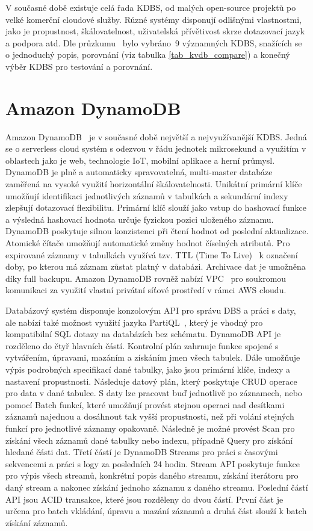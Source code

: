 \documentclass[czech,master,dept460,male,csharp,cpdeclaration]{diploma}
\begin{document}
	V současné době existuje celá řada KDBS, od malých open-source projektů po velké komerční cloudové služby. Různé systémy disponují odlišnými vlastnostmi, jako je propustnost, škálovatelnost, uživatelská přívětivost skrze dotazovací jazyk a podpora atd. Dle průzkumu~\cite{predictiveanalyticstoday,g2,db-engineers-ranking} bylo vybráno~9 významných KDBS, snažících se o jednoduchý popis, porovnání (viz tabulka \ref{tab_kvdb_compare}) a konečný výběr KDBS  pro testování a porovnání.
	
	\section{Amazon DynamoDB}
	
	Amazon DynamoDB~\cite{dynamodb} je v současné době největší a nejvyužívanější KDBS. Jedná se o serverless cloud systém s odezvou v řádu jednotek mikrosekund a využitím v oblastech jako je web, technologie IoT, mobilní aplikace a herní průmysl. DynamoDB je plně a automaticky spravovatelná, multi-master databáze zaměřená na vysoké využití horizontální škálovatelnosti. Unikátní primární klíče umožňují identifikaci jednotlivých záznamů v tabulkách a sekundární indexy zlepšují dotazovací flexibilitu. Primární klíč slouží jako vstup do hashovací funkce a výsledná hashovací hodnota určuje fyzickou pozici uloženého záznamu. DynamoDB poskytuje silnou konzistenci při čtení hodnot od poslední aktualizace. Atomické čítače umožňují automatické změny hodnot číselných atributů. Pro expirované záznamy v tabulkách využívá tzv. TTL (Time To Live)~\cite{ttl} k označení doby, po kterou má záznam zůstat platný v databázi. Archivace dat je umožněna díky full backupu. Amazon DynamoDB rovněž nabízí VPC~\cite{vpc} pro soukromou komunikaci za využití vlastní privátní síťové prostředí v rámci AWS cloudu.
	
	Databázový systém disponuje konzolovým API pro správu DBS a práci s daty, ale nabízí také možnost využití jazyka PartiQL~\cite{partiql}, který je vhodný pro kompatibilní SQL dotazy na databázích bez schématu. DynamoDB API je rozděleno do čtyř hlavních částí. Kontrolní plán zahrnuje funkce spojené s vytvářením, úpravami, mazáním a získáním jmen všech tabulek. Dále umožňuje výpis podrobných specifikací dané tabulky, jako jsou primární klíče, indexy a nastavení propustnosti. Následuje datový plán, který poskytuje CRUD operace pro data v dané tabulce. S daty lze pracovat buď jednotlivě po záznamech, nebo pomocí Batch funkcí, které umožňují provést stejnou operaci nad desítkami záznamů najednou a dosáhnout tak vyšší propustnosti, než při volání stejných funkcí pro jednotlivé záznamy opakovaně. Následně je možné provést Scan pro získání všech záznamů dané tabulky nebo indexu, případně Query pro získání hledané části dat. Třetí částí je DynamoDB Streams pro práci s časovými sekvencemi a práci s logy za posledních 24 hodin. Stream API poskytuje funkce pro výpis všech streamů, konkrétní popis daného streamu, získání iterátoru pro daný stream a nakonec získání jednoho záznamu z daného streamu. Poslední částí API jsou ACID transakce, které jsou rozděleny do dvou částí. První část je určena pro batch vkládání, úpravu a mazání záznamů a druhá část slouží k batch získání záznamů.
		
\end{document}
